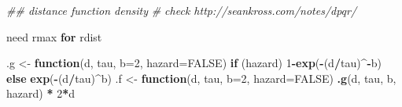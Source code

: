 \documentclass[12pt,]{book}
\newenvironment{Shaded}{\begin{snugshade}}{\end{snugshade}}
\newcommand{\CommentTok}[1]{\textcolor[rgb]{0.56,0.35,0.01}{\textit{#1}}}
\newcommand{\ControlFlowTok}[1]{\textcolor[rgb]{0.13,0.29,0.53}{\textbf{#1}}}
\newcommand{\DataTypeTok}[1]{\textcolor[rgb]{0.13,0.29,0.53}{#1}}
\newcommand{\DecValTok}[1]{\textcolor[rgb]{0.00,0.00,0.81}{#1}}
\newcommand{\KeywordTok}[1]{\textcolor[rgb]{0.13,0.29,0.53}{\textbf{#1}}}
\newcommand{\NormalTok}[1]{#1}
\newcommand{\OperatorTok}[1]{\textcolor[rgb]{0.81,0.36,0.00}{\textbf{#1}}}
\newcommand{\OtherTok}[1]{\textcolor[rgb]{0.56,0.35,0.01}{#1}}
\newcommand{\StringTok}[1]{\textcolor[rgb]{0.31,0.60,0.02}{#1}}
\begin{document}
\begin{Shaded}
\begin{Highlighting}[]
\CommentTok{## distance function density}
\CommentTok{# check http://seankross.com/notes/dpqr/}

\NormalTok{need rmax }\ControlFlowTok{for}\NormalTok{ rdist}

\NormalTok{.g <-}\StringTok{ }\ControlFlowTok{function}\NormalTok{(d, tau, }\DataTypeTok{b=}\DecValTok{2}\NormalTok{, }\DataTypeTok{hazard=}\OtherTok{FALSE}\NormalTok{)}
  \ControlFlowTok{if}\NormalTok{ (hazard)}
    \DecValTok{1}\OperatorTok{-}\KeywordTok{exp}\NormalTok{(}\OperatorTok{-}\NormalTok{(d}\OperatorTok{/}\NormalTok{tau)}\OperatorTok{^-}\NormalTok{b) }\ControlFlowTok{else} \KeywordTok{exp}\NormalTok{(}\OperatorTok{-}\NormalTok{(d}\OperatorTok{/}\NormalTok{tau)}\OperatorTok{^}\NormalTok{b)}
\NormalTok{.f <-}\StringTok{ }\ControlFlowTok{function}\NormalTok{(d, tau, }\DataTypeTok{b=}\DecValTok{2}\NormalTok{, }\DataTypeTok{hazard=}\OtherTok{FALSE}\NormalTok{)}
  \KeywordTok{.g}\NormalTok{(d, tau, b, hazard) }\OperatorTok{*}\StringTok{ }\DecValTok{2}\OperatorTok{*}\NormalTok{d}


\end{Highlighting}
\end{Shaded}
\end{document}
